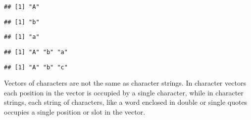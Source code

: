 \documentclass[paper=a4,headsepline,BCOR=12mm,twoside,open=right,%
titlepage,headings=small,fontsize=10pt,index=totoc,bibliography=totoc,%
captions=tableheading,captions=nooneline]{scrbook}\usepackage{knitr}
\begin{document}
\begin{knitrout}\footnotesize
{}\color{fgcolor}\begin{kframe}
\begin{alltt}
 \hlkwb{<-} 
 \hlkwb{<-} \hlstd{letters[}\hlstd{]}
 \hlkwb{<-} \hlstd{letters[}\hlstd{]}
\end{alltt}
\begin{verbatim}
## [1] "A"
\end{verbatim}
\begin{alltt}
\end{alltt}
\begin{verbatim}
## [1] "b"
\end{verbatim}
\begin{alltt}
\end{alltt}
\begin{verbatim}
## [1] "a"
\end{verbatim}
\begin{alltt}
 \hlkwb{<-} 
\end{alltt}
\begin{verbatim}
## [1] "A" "b" "a"
\end{verbatim}
\begin{alltt}
 \hlkwb{<-}  \hlstd{)}
\end{alltt}
\begin{verbatim}
## [1] "A" "b" "c"
\end{verbatim}
\begin{alltt}
 \hlkwb{<-} 
 \hlopt{+} \hlstd{)}
\end{alltt}
\end{kframe}
\end{knitrout}

Vectors of characters are not the same as character strings. In character vectors each position in the vector is occupied by a single character, while in character strings, each string of characters, like a word enclosed in double or single quotes occupies a single position or slot in the vector.
\end{document}
